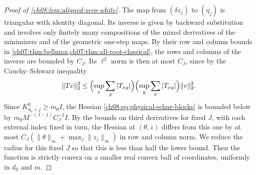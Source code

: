 \begin{proof}[Proof of \cref{ch08:lem:aligned-zero-white}]
The map from $(\delta z_j)$ to $(\eta_j)$ is triangular with identity diagonal. Its inverse is given by backward substitution and involves only finitely many compositions of the mixed derivatives of the minimizers and of the geometric one-step maps. By their row and column bounds in \cref{ch07:thm:bellman,ch07:thm:all-root-classical}, the rows and columns of the inverse are bounded by $C_J$. Its $\ell^2$ norm is then at most $C_J$, since by the Cauchy--Schwarz inequality
\[
 \|Tv\|_2^2\le\Bigl(\sup_x\sum_y|T_{xy}|\Bigr)\Bigl(\sup_y\sum_x|T_{xy}|\Bigr)\|v\|_2^2.
\]
Since $K_{d_0+j}^0\ge m_0I$, the Hessian \eqref{ch08:eq:physical-schur-blocks} is bounded below by $m_0M^{-(J-1)}C_J^{-2}I$. By the bounds on third derivatives for fixed $J$, with each external index fixed in turn, the Hessian at $(\theta,z)$ differs from this one by at most $C_J(\|\theta\|_\infty+\max_j\|z_j\|_\infty)$ in row and column norm. We reduce the radius for this fixed $J$ so that this is less than half the lower bound. Then the function is strictly convex on a smaller real convex ball of coordinates, uniformly in $d_0$ and $m$.


\end{proof}
